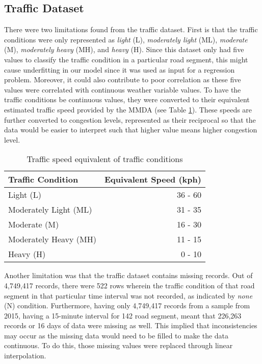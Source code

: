 \subsection{Traffic Dataset}
There were two limitations found from the traffic dataset. First is that the traffic conditions were only represented as \textit{light} (L), \textit{moderately light} (ML), \textit{moderate} (M), \textit{moderately heavy} (MH), and \textit{heavy} (H). Since this dataset only had five values to classify the traffic condition in a particular road segment, this might cause underfitting in our model since it was used as input for a regression problem. Moreover, it could also contribute to poor correlation as these five values were correlated with continuous weather variable values. To have the traffic conditions be continuous values, they were converted to their equivalent estimated traffic speed provided by the MMDA (see Table \ref{table_traffic_condition}). These speeds are further converted to congestion levels, represented as their reciprocal so that the data would be easier to interpret such that higher value means higher congestion level.

\begin{table}[h]
\centering
\caption{Traffic speed equivalent of traffic conditions}
\label{table_traffic_condition}
\begin{tabular}{|l|r|}
\hline
\textbf{Traffic Condition} & \multicolumn{1}{l|}{\textbf{Equivalent Speed (kph)}} \\ \hline
Light (L)                  & 36 - 60                                             \\ \hline
Moderately Light (ML)                  & 31 - 35                                            \\ \hline
Moderate (M)               & 16 - 30                                             \\ \hline
Moderately Heavy (MH)                  & 11 - 15                                             \\ \hline
Heavy (H)                  & 0 - 10                                              \\ \hline
\end{tabular}
\end{table}


Another limitation was that the traffic dataset contains missing records. Out of 4,749,417 records, there were 522 rows wherein the traffic condition of that road segment in that particular time interval was not recorded, as indicated by \textit{none} (N) condition. Furthermore, having only 4,749,417 records from a sample from 2015, having a 15-minute interval for 142 road segment, meant that 226,263 records or 16 days of data were missing as well. This implied that inconsistencies may occur as the missing data would need to be filled to make the data continuous. To do this, those missing values were replaced through linear interpolation.

